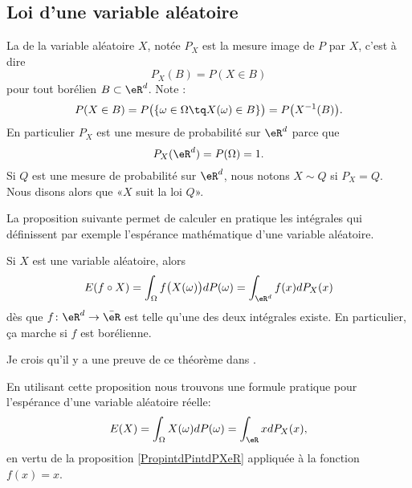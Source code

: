 \subsection{Loi d'une variable aléatoire}

La  de la variable aléatoire \( X\), notée \( P_X\) est la mesure image de \( P\) par \( X\), c'est à dire
\begin{equation}
    P_X(B)=P(X\in B)
\end{equation}
pour tout borélien \( B\subset\eR^d\). Note :
\begin{equation}
    P(X\in B)=P\big( \{ \omega\in\Omega\tq X(\omega)\in B \} \big)=P\big( X^{-1}(B) \big).
\end{equation}
En particulier \( P_X\) est une mesure de probabilité sur \( \eR^d\) parce que 
\begin{equation}
    P_X(\eR^d)=P(\Omega)=1.
\end{equation}
Si \( Q\) est une mesure de probabilité sur \( \eR^d\), nous notons \( X\sim Q\) si \( P_X=Q\). Nous disons alors que «\( X\) suit la loi \( Q\)».

La proposition suivante permet de calculer en pratique les intégrales qui définissent par exemple l'espérance mathématique d'une variable aléatoire.
\begin{proposition}     \label{PropintdPintdPXeR}
    Si \( X\) est une variable aléatoire, alors
    \begin{equation}
        E(f\circ X)=\int_{\Omega}f\big( X(\omega) \big)dP(\omega)=\int_{\eR^d}f(x)dP_X(x)
    \end{equation}
    dès que \( f\colon \eR^d\to \bar\eR\) est telle qu'une des deux intégrales existe. En particulier, ça marche si \( f\) est borélienne.
\end{proposition}
Je crois qu'il y a une preuve de ce théorème dans \cite{ThjoTrnSaada}.


En utilisant cette proposition nous trouvons une formule pratique pour l'espérance d'une variable aléatoire réelle:
\begin{equation}
    E(X)=\int_{\Omega}X(\omega)dP(\omega)=\int_{\eR}xdP_X(x),
\end{equation}
en vertu de la proposition \ref{PropintdPintdPXeR} appliquée à la fonction \( f(x)=x\).

